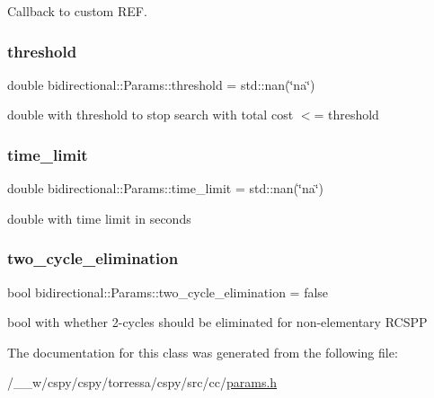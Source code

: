 Callback to custom R\+EF. 

\mbox{\label{classbidirectional_1_1Params_ac7099f442d46b684fcbe55ba9c6657e4}} 
\subsubsection{\texorpdfstring{threshold}{threshold}}
{\footnotesize\ttfamily double bidirectional\+::\+Params\+::threshold = std\+::nan(\char`\"{}na\char`\"{})}



double with threshold to stop search with total cost $<$= threshold 

\mbox{\label{classbidirectional_1_1Params_a2c0fd34b19d753cfce75690a5d68e1e1}} 
\subsubsection{\texorpdfstring{time\+\_\+limit}{time\_limit}}
{\footnotesize\ttfamily double bidirectional\+::\+Params\+::time\+\_\+limit = std\+::nan(\char`\"{}na\char`\"{})}



double with time limit in seconds 

\mbox{\label{classbidirectional_1_1Params_ade4211d18d72a33dccb323ea1861fe70}} 
\subsubsection{\texorpdfstring{two\+\_\+cycle\+\_\+elimination}{two\_cycle\_elimination}}
{\footnotesize\ttfamily bool bidirectional\+::\+Params\+::two\+\_\+cycle\+\_\+elimination = false}



bool with whether 2-\/cycles should be eliminated for non-\/elementary R\+C\+S\+PP 



The documentation for this class was generated from the following file\+:\begin{DoxyCompactItemize}
\item 
/\+\_\+\+\_\+w/cspy/cspy/torressa/cspy/src/cc/\hyperlink{params_8h}{params.\+h}\end{DoxyCompactItemize}
